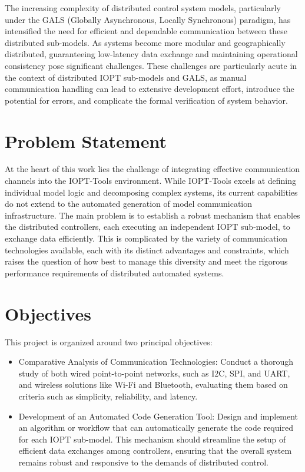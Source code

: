 The increasing complexity of distributed control system models, particularly under the GALS (Globally Asynchronous, Locally Synchronous) paradigm, has intensified the need for efficient and dependable communication between these distributed sub-models. As systems become more modular and geographically distributed, guaranteeing low-latency data exchange and maintaining operational consistency pose significant challenges. These challenges are particularly acute in the context of distributed IOPT sub-models and GALS, as manual communication handling can lead to extensive development effort, introduce the potential for errors, and complicate the formal verification of system behavior.


\section{Problem Statement}
\label{sec:problem_statement}


At the heart of this work lies the challenge of integrating effective communication channels into the IOPT-Tools environment. While IOPT-Tools excels at defining individual model logic and decomposing complex systems, its current capabilities do not extend to the automated generation of model communication infrastructure. The main problem is to establish a robust mechanism that enables the distributed controllers, each executing an independent IOPT sub-model, to exchange data efficiently. This is complicated by the variety of communication technologies available, each with its distinct advantages and constraints, which raises the question of how best to manage this diversity and meet the rigorous performance requirements of distributed automated systems.

\section{Objectives}
\label{sec:objectives}

This project is organized around two principal objectives:

\begin{itemize}
    \item Comparative Analysis of Communication Technologies: Conduct a thorough study of both wired point-to-point networks, such as I2C, SPI, and UART, and wireless solutions like Wi-Fi and Bluetooth, evaluating them based on criteria such as simplicity, reliability, and latency.
    \item Development of an Automated Code Generation Tool: Design and implement an algorithm or workflow that can automatically generate the code required for each IOPT sub-model. This mechanism should streamline the setup of efficient data exchanges among controllers, ensuring that the overall system remains robust and responsive to the demands of distributed control.
\end{itemize}

